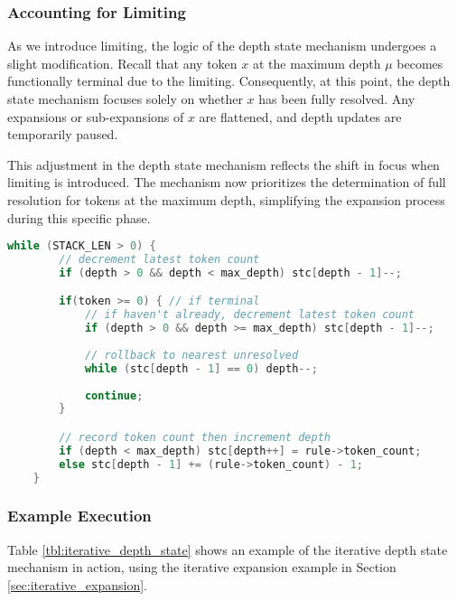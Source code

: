 \documentclass[8pt, twoside]{extarticle}
\begin{document}
\subsubsection{Accounting for Limiting}

As we introduce limiting, the logic of the depth state mechanism undergoes a slight modification. Recall that any token $x$ at the maximum depth $\mu$ becomes functionally terminal due to the limiting. Consequently, at this point, the depth state mechanism focuses solely on whether $x$ has been fully resolved. Any expansions or sub-expansions of $x$ are flattened, and depth updates are temporarily paused.

This adjustment in the depth state mechanism reflects the shift in focus when limiting is introduced. The mechanism now prioritizes the determination of full resolution for tokens at the maximum depth, simplifying the expansion process during this specific phase.

\begin{lstlisting}[gobble=2, language=C, caption={Complete depth state maintenance mechanism}]
	while (STACK_LEN > 0) {
		// decrement latest token count
		if (depth > 0 && depth < max_depth) stc[depth - 1]--;

		if(token >= 0) { // if terminal
			// if haven't already, decrement latest token count
			if (depth > 0 && depth >= max_depth) stc[depth - 1]--;
			
			// rollback to nearest unresolved
			while (stc[depth - 1] == 0) depth--;
			
			continue;
		}

		// record token count then increment depth
		if (depth < max_depth) stc[depth++] = rule->token_count;
		else stc[depth - 1] += (rule->token_count) - 1;
	}
\end{lstlisting}

\subsubsection{Example Execution}

Table \ref{tbl:iterative_depth_state} shows an example of the iterative depth state mechanism in action, using the iterative expansion example in Section \ref{sec:iterative_expansion}.
\end{document}
